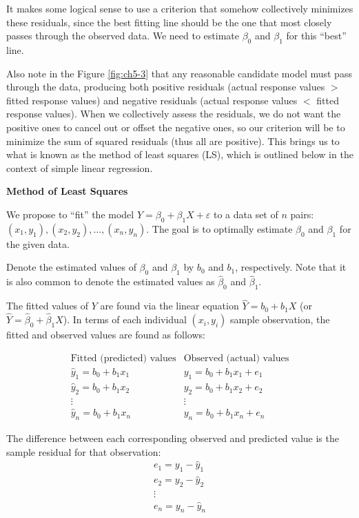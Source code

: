 \documentclass[
]{book}
\begin{document}
It makes some logical sense to use a criterion that somehow collectively minimizes these residuals, since the best fitting line should be the one that most closely passes through the observed data.
We need to estimate \(\beta_0\) and \(\beta_1\) for this ``best'' line.

Also note in the Figure \ref{fig:ch5-3} that any reasonable candidate model must pass through the data, producing both positive residuals (actual response values \(>\) fitted response values) and negative residuals (actual response values \(<\) fitted response values).
When we collectively assess the residuals, we do not want the positive ones to cancel out or offset the negative ones, so our criterion will be to minimize the sum of squared residuals (thus all are positive).
This brings us to what is known as the method of least squares (LS), which is outlined below in the context of simple linear regression.

\textbf{Method of Least Squares}

We propose to ``fit'' the model \(Y = \beta_0 + \beta_1 X + \varepsilon\) to a data set of \(n\) pairs: \((x_1, y_1), (x_2, y_2), \ldots, (x_n, y_n)\).
The goal is to optimally estimate \(\beta_0\) and \(\beta_1\) for the given data.

Denote the estimated values of \(\beta_0\) and \(\beta_1\) by \(b_0\) and \(b_1\), respectively.
Note that it is also common to denote the estimated values as \(\hat{\beta}_0\) and \(\hat{\beta}_1\).

The fitted values of \(Y\) are found via the linear equation \(\hat{Y}=b_0 + b_1 X\) (or \(\hat{Y}=\hat{\beta}_0 + \hat{\beta}_1 X\)).
In terms of each individual \((x_i, y_i)\) sample observation, the fitted and observed values are found as follows:

\[\begin{array}{c|c}
\textrm{Fitted (predicted) values} & \textrm{Observed (actual) values} \\
\hline
\hat{y}_1 = b_0 + b_1 x_1 & y_1 = b_0 + b_1 x_1 + e_1 \\
\hat{y}_2 = b_0 + b_1 x_2 & y_2 = b_0 + b_1 x_2 + e_2 \\
\vdots & \vdots \\
\hat{y}_n = b_0 + b_1 x_n & y_n = b_0 + b_1 x_n + e_n 
\end{array}\]

The difference between each corresponding observed and predicted value is the sample residual for that observation:
\[\begin{array}{c}
e_1 = y_1 - \hat{y}_1 \\
e_2 = y_2 - \hat{y}_2 \\
\vdots \\
e_n = y_n - \hat{y}_n
\end{array}\]
\end{document}
